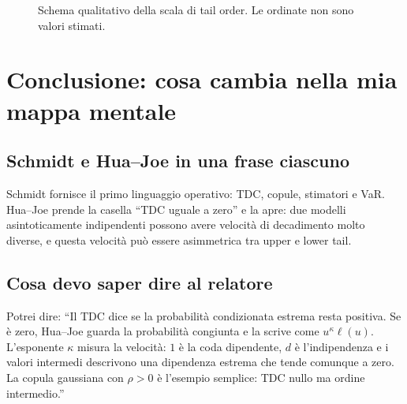 \documentclass[11pt,a4paper]{article}
\begin{document}
\begin{figure}[ht]
\centering
{}
\caption{Schema qualitativo della scala di tail order. Le ordinate non sono valori stimati.}
\label{fig:classification}
\end{figure}

\section{Conclusione: cosa cambia nella mia mappa mentale}

\subsection*{Schmidt e Hua--Joe in una frase ciascuno}
Schmidt fornisce il primo linguaggio operativo: TDC, copule, stimatori e VaR.
Hua--Joe prende la casella ``TDC uguale a zero'' e la apre: due modelli
asintoticamente indipendenti possono avere velocità di decadimento molto
diverse, e questa velocità può essere asimmetrica tra upper e lower tail.

\subsection*{Cosa devo saper dire al relatore}
Potrei dire: ``Il TDC dice se la probabilità condizionata estrema resta
positiva. Se è zero, Hua--Joe guarda la probabilità congiunta e la scrive come
$u^\kappa\ell(u)$. L'esponente $\kappa$ misura la velocità: $1$ è la coda
dipendente, $d$ è l'indipendenza e i valori intermedi descrivono una
dipendenza estrema che tende comunque a zero. La copula gaussiana con $\rho>0$
è l'esempio semplice: TDC nullo ma ordine intermedio.''
\end{document}
